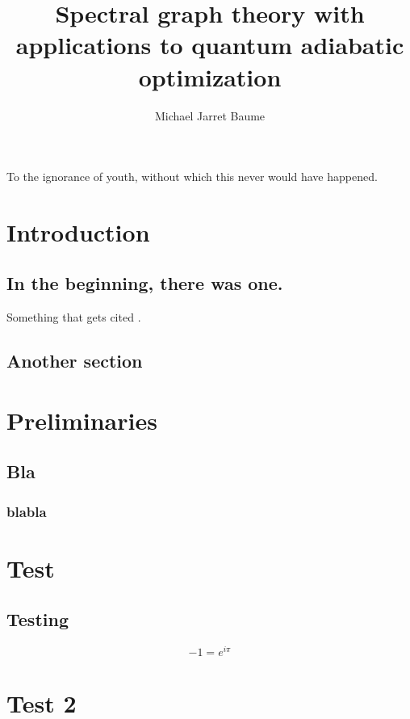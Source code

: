 \documentclass[letterpaper,12pt]{umd-thesis}  %
\title{Spectral graph theory with applications to quantum adiabatic optimization} %
\author{Michael Jarret Baume} %
\begin{document}
\begin{abstract}
    \lipsum[1]
    \lipsum[2]
    \lipsum[3]
\end{abstract} 

\begin{preliminary}

	\begin{preface}
		\lipsum[4]
	\end{preface}
	
	\begin{foreword}
		\lipsum[5]
	\end{foreword}

	\begin{dedication}
		To the ignorance of youth, without which this never would have happened.
	\end{dedication}

	\begin{acknowledgements}
		\lipsum[6]
	\end{acknowledgements}
\end{preliminary}

\chapter{Introduction}
	\section{In the beginning, there was one.}
	\lipsum[7] 
	
	Something that gets cited \cite{Ashbaugh1990}.
	\section{Another section}
	\lipsum[8]
	
\chapter{Preliminaries}
	\lipsum[9]
	\section{Bla}
	\lipsum[10]
	\subsection{blabla}
	\lipsum[11]

\appendix
\chapter{Test}
	\section{Testing}
	 \lipsum[5]
	 	\begin{equation}
	 		-1 = e^{i \pi}
	 	\end{equation}
	 	
	 \lipsum[10]
\chapter{Test 2}
	\lipsum[1]


\end{document}

